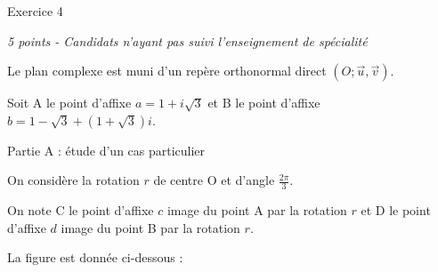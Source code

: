 
%
\begin{h2}Exercice 4\end{h2}
\textit{5 points - Candidats n'ayant pas suivi l'enseignement de spécialité }
\par
Le plan complexe est muni d'un repère orthonormal direct $\left(O; \vec{u}, \vec{v}\right)$.
\par
Soit A le point d'affixe $a=1+i\sqrt{3}$ et B le point d'affixe $b=1-\sqrt{3}+\left(1+\sqrt{3}\right)i$.
\begin{h3}Partie A : étude d'un cas particulier\end{h3}
On considère la rotation $r$ de centre O et d'angle $\frac{2\pi }{3}$.
\par
On note C le point d'affixe $c$ image du point A par la rotation $r$ et D le point d'affixe $d$ image du point B par la rotation $r$.
\par
La figure est donnée ci-dessous :


